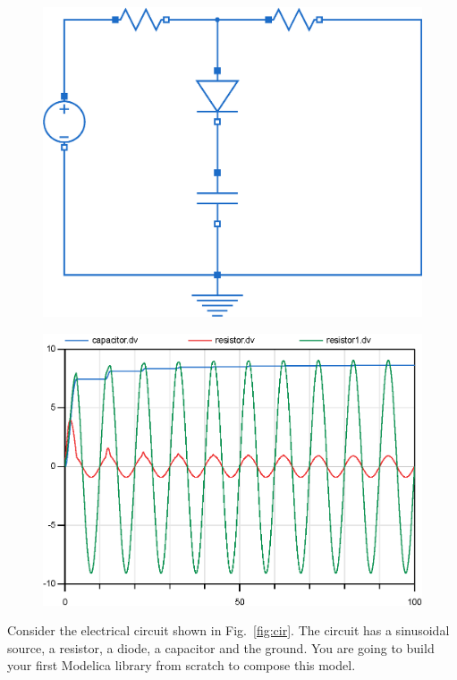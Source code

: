\documentclass[10pt,a4paper]{article}
\begin{document}
\begin{figure}[h]
	\centering
	\begin{minipage}{.4\textwidth}
		\centering
		\includegraphics[width=1\linewidth]{images/circuit.eps}
		\label{fig:cir}
	\end{minipage}%
	\begin{minipage}{.6\textwidth}
		\centering
		\includegraphics[width=.8\linewidth]{images/result.eps}
		\label{fig:res}
	\end{minipage}
\end{figure}


Consider the electrical circuit shown in Fig.~\ref{fig:cir}. The circuit has a 
sinusoidal source, a resistor, a diode, a capacitor and the ground. You are 
going to build your first Modelica library from scratch to compose this model.
\end{document}
